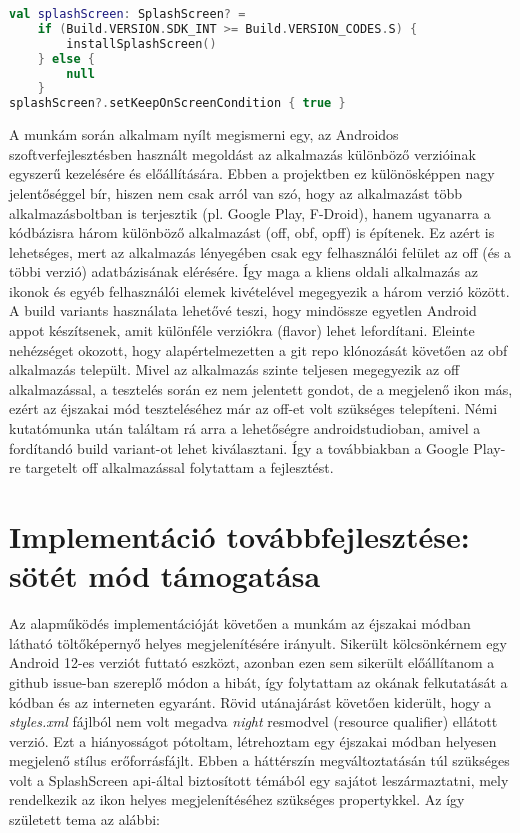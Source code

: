 \begin{lstlisting}[frame=single, language=Kotlin, caption=A \gls{splashscreen} compat könyvtár
    segítségével visszafele kompatibilitást támogató kódrészlet]
val splashScreen: SplashScreen? =
    if (Build.VERSION.SDK_INT >= Build.VERSION_CODES.S) {
        installSplashScreen()
    } else {
        null
    }
splashScreen?.setKeepOnScreenCondition { true }
\end{lstlisting}


A munkám során alkalmam nyílt megismerni egy, az Androidos szoftverfejlesztésben használt
megoldást az alkalmazás különböző verzióinak egyszerű kezelésére és előállítására. Ebben a projektben ez
különösképpen nagy jelentőséggel bír, hiszen nem csak arról van szó, hogy az alkalmazást több
alkalmazásboltban is terjesztik (pl. Google Play, F-Droid), hanem ugyanarra a kódbázisra
három különböző alkalmazást (\acrfull{off}, \acrfull{obf}, \acrfull{opff})
is építenek. Ez azért is lehetséges, mert az alkalmazás lényegében csak egy felhasználói felület
az \acrlong{off} (és a többi verzió) adatbázisának elérésére. Így maga a kliens oldali alkalmazás
az ikonok és egyéb felhasználói elemek kivételével megegyezik a három verzió között.
A build variants használata lehetővé teszi, hogy mindössze egyetlen Android appot
készítsenek, amit különféle verziókra (flavor) lehet lefordítani. Eleinte nehézséget okozott,
hogy alapértelmezetten a \Gls{git} \gls{repo} klónozását követően az \acrlong{obf} alkalmazás
települt. Mivel az alkalmazás szinte teljesen megegyezik az \acrlong{off} alkalmazással, a
tesztelés során ez nem jelentett gondot, de a  megjelenő ikon más, ezért az éjszakai
mód teszteléséhez már az \acrlong{off}-et volt szükséges telepíteni. Némi kutatómunka után
találtam rá arra a lehetőségre \gls{androidstudio}ban, amivel a fordítandó build variant-ot lehet
kiválasztani. Így a továbbiakban a Google Play-re targetelt \acrlong{off} alkalmazással
folytattam a fejlesztést.

\section{Implementáció továbbfejlesztése: sötét mód támogatása}
Az alapműködés implementációját követően a munkám az éjszakai módban látható töltőképernyő helyes megjelenítésére irányult.
Sikerült kölcsönkérnem egy Android 12-es verziót futtató eszközt, azonban ezen sem sikerült
előállítanom a \gls{github} issue-ban \cite{issue} szereplő módon a hibát, így folytattam az okának felkutatását
a kódban és az interneten egyaránt. Rövid utánajárást követően kiderült, hogy a
\textit{styles.xml} fájlból nem volt megadva \textit{night} \gls{resmod}vel
(resource qualifier) ellátott verzió. Ezt a hiányosságot pótoltam, létrehoztam egy éjszakai
módban helyesen megjelenő stílus erőforrásfájlt. Ebben a háttérszín megváltoztatásán túl szükséges
volt a SplashScreen \acrshort{api}-által biztosított témából egy sajátot leszármaztatni, mely rendelkezik
az ikon helyes megjelenítéséhez szükséges propertykkel. Az így született \gls{tema} az alábbi:

